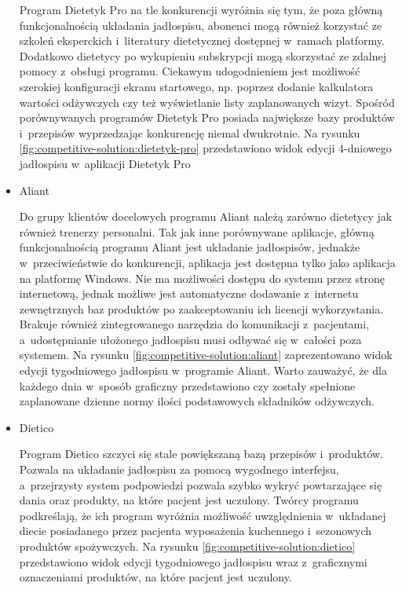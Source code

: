 \begin{itemize}
        Program Dietetyk Pro\cite{url:dietetyk-pro} na tle konkurencji wyróżnia się tym, że poza główną funkcjonalnością układania jadłospisu,
        abonenci mogą również korzystać ze szkoleń eksperckich i~literatury dietetycznej dostępnej w~ramach platformy.
        Dodatkowo dietetycy po wykupieniu subskrypcji mogą skorzystać ze zdalnej pomocy z~obsługi programu.
        Ciekawym udogodnieniem jest możliwość szerokiej konfiguracji ekranu startowego, np. poprzez dodanie kalkulatora wartości odżywczych czy też wyświetlanie listy zaplanowanych wizyt.
        Spośród porównywanych programów Dietetyk Pro posiada największe bazy produktów i~przepisów wyprzedzając konkurencję niemal dwukrotnie.
        Na rysunku \ref{fig:competitive-solution:dietetyk-pro} przedstawiono widok edycji 4-dniowego jadłospisu w~aplikacji Dietetyk Pro


    \item Aliant

        Do grupy klientów docelowych programu Aliant\cite{url:aliant} należą zarówno dietetycy jak również trenerzy personalni.
        Tak jak inne porównywane aplikacje, główną funkcjonalnością programu Aliant jest układanie jadłospisów,
        jednakże w~przeciwieństwie do konkurencji, aplikacja jest dostępna tylko jako aplikacja na platformę Windows.
        Nie ma możliwości dostępu do systemu przez stronę internetową, jednak możliwe jest automatyczne dodawanie z~internetu zewnętrznych baz produktów po zaakceptowaniu ich licencji wykorzystania.
        Brakuje również zintegrowanego narzędzia do komunikacji z~pacjentami, a~udostępnianie ułożonego jadłospisu musi odbywać się w~całości poza systemem.
        Na rysunku \ref{fig:competitive-solution:aliant} zaprezentowano widok edycji tygodniowego jadłospisu w~programie Aliant.
        Warto zauważyć, że dla każdego dnia w~sposób graficzny przedstawiono czy zostały spełnione zaplanowane dzienne normy ilości podstawowych składników odżywczych.


    \item Dietico

        Program Dietico\cite{url:dietico} szczyci się stale powiększaną bazą przepisów i~produktów.
        Pozwala na układanie jadłospisu za pomocą wygodnego interfejsu,
        a~przejrzysty system podpowiedzi pozwala szybko wykryć powtarzające się dania oraz produkty, na które pacjent jest uczulony.
        Twórcy programu podkreślają, że ich program wyróżnia możliwość uwzględnienia w~układanej diecie posiadanego przez pacjenta wyposażenia kuchennego i~sezonowych produktów spożywczych.
        Na rysunku \ref{fig:competitive-solution:dietico} przedstawiono widok edycji tygodniowego jadłospisu wraz z~graficznymi oznaczeniami produktów, na które pacjent jest uczulony.


\end{itemize}
